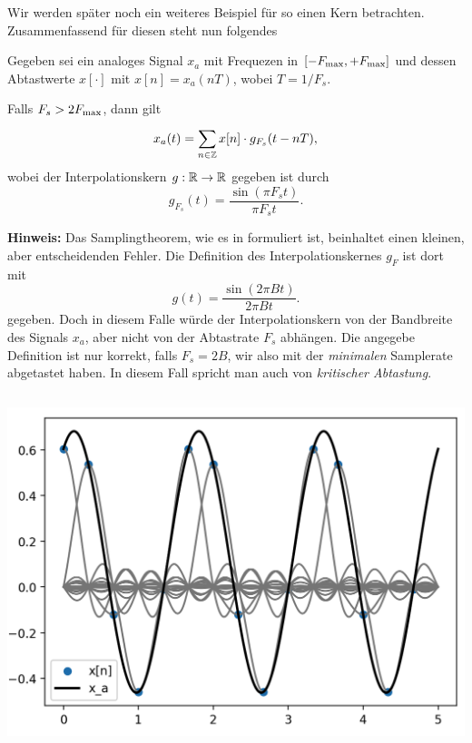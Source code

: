 Wir werden später noch ein weiteres Beispiel für so einen Kern betrachten. 
Zusammenfassend für diesen  steht nun folgendes
%
%
\begin{Thm}[Samplingtheorem]\label{stm:sampling_theorem}
Gegeben sei ein analoges Signal $x_a$ mit Frequezen in $[-F_{\rm max},+F_{\rm max}]$ und dessen Abtastwerte $x[\cdot]$ mit $x[n] = x_a(nT)$, wobei $T = 1/F_s$.

Falls $F_s > 2 F_{\rm max}$, dann gilt
\begin{equation}\label{eq:sampling_theorem}
    x_a(t) = {\sum\limits_{n \in \mathbb{Z}}^{}{
        x[n] \cdot g_{F_s}(t - n T),
    }}
\end{equation}
wobei der Interpolationskern $g : \mathbb{R} \rightarrow \mathbb{R}$ gegeben ist durch
\[
g_{F_s}(t) = \frac{\sin(\pi F_s t)}{\pi F_s t}.
\]
\end{Thm}
%
%
\textbf{Hinweis:} 
Das Samplingtheorem, wie es in \cite{proakis2013} formuliert ist, beinhaltet einen kleinen, aber entscheidenden Fehler. 
Die Definition des Interpolationskernes $g_F$ ist dort mit
\[
g(t) = \frac{\sin(2 \pi B t)}{2 \pi B t}.
\]
gegeben. 
Doch in diesem Falle würde der Interpolationskern von der Bandbreite des Signals $x_a$, aber nicht von der Abtastrate $F_s$ abhängen. 
Die angegebe Definition ist nur korrekt, falls $F_s = 2 B$, wir also mit der \emph{minimalen} Samplerate abgetastet haben.
In diesem Fall spricht man auch von \emph{kritischer Abtastung}.
%
\begin{listing}
    \begin{minipage}{0.49\textwidth}
        \strut\vspace*{-\baselineskip}\newline
        \inputminted[firstline=4,lastline=51]{python3}{code/sampling_theorem.py}
    \end{minipage}
    \begin{minipage}{0.49\textwidth}
        \strut\vspace*{-\baselineskip}\newline
        \includegraphics[width=\textwidth]{code/sampling_theorem.png}
    \end{minipage}
    \label{py:sampling_theorem}
\end{listing}

